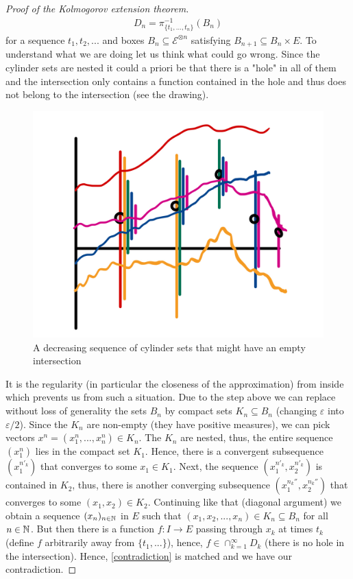 \begin{proof}[Proof of the Kolmogorov extension theorem]
\begin{align*}
	D_n=\pi^{-1}_{\{t_1,...,t_n\}}(B_n)
\end{align*}
for a sequence $t_1,t_2,...$ and boxes $B_n\subseteq \mathcal E^{\otimes n}$ satisfying $B_{n+1}\subseteq B_{n}\times E$. To understand what we are doing let us think what could go wrong. Since the cylinder sets are nested it could a priori be that there is a "hole"{} in all of them and the intersection only contains a function contained in the hole and thus does not belong to the intersection (see the drawing).
\begin{figure}[h]
	\begin{center}
		\includegraphics[scale=0.1]{bunt.jpeg}
		\caption*{A decreasing sequence of cylinder sets that might have an empty intersection}
	\end{center}
	\end{figure}

It is the regularity (in particular the closeness of the approximation) from inside which prevents us from such a situation. Due to the step above we can replace without loss of generality the sets $B_n$ by compact sets $K_n\subseteq B_n$ (changing $\varepsilon$ into $\varepsilon/2$). Since the $K_n$ are non-empty (they have positive measures), we can pick vectors $x^n=(x_1^n,...,x_n^n)\in K_n$. The $K_n$ are nested, thus, the entire sequence $(x_1^n)$ lies in the compact set $K_1$. Hence, there is a convergent subsequence $(x_1^{n'_k})$ that converges to some $x_1\in K_1$. Next, the sequence $(x_1^{n'_k}, x_2^{n'_k})$ is contained in $K_2$, thus, there is another converging subsequence $(x_1^{n_k''}, x_2^{n_k''})$ that converges to some $(x_1,x_2)\in K_2$. Continuing like that (diagonal argument) we obtain a sequence $(x_n)_{n\in\mathbb{N}}$ in $E$ such that $(x_1,x_2,...,x_n)\in K_n\subseteq B_n$ for all $n\in\mathbb{N}$. But then there is a function $f:I\to E$ passing through $x_k$ at times $t_k$ (define $f$ arbitrarily away from $\{t_1,...\}$), hence, $f\in \cap_{k=1}^\infty D_k$ (there is no hole in the intersection). Hence, \eqref{contradiction} is matched and we have our contradiction.
\end{proof}
